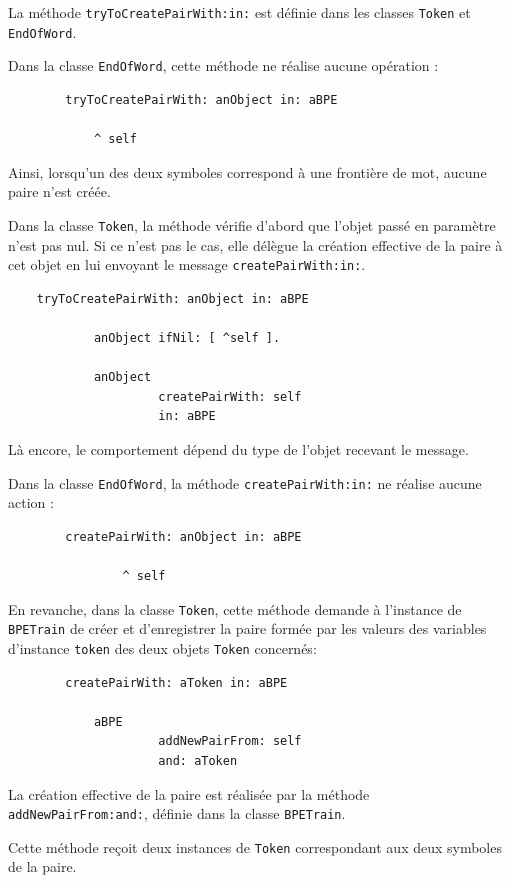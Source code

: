 \documentclass[12pt,a4paper]{report}
\begin{document}
	La méthode \texttt{tryToCreatePairWith:in:} est définie dans les classes \texttt{Token} et \texttt{EndOfWord}.
	
	Dans la classe \texttt{EndOfWord}, cette méthode ne réalise aucune opération :
	
	\begin{verbatim}
		tryToCreatePairWith: anObject in: aBPE
		
			^ self 
	\end{verbatim}
	
	Ainsi, lorsqu'un des deux symboles correspond à une frontière de mot, aucune paire n'est créée.
	
	Dans la classe \texttt{Token}, la méthode vérifie d'abord que l'objet passé en paramètre n'est pas nul. Si ce n'est pas le cas, elle délègue la création effective de la paire à cet objet en lui envoyant le message \texttt{createPairWith:in:}.
	
	\begin{verbatim}
	tryToCreatePairWith: anObject in: aBPE

			anObject ifNil: [ ^self ].
				
			anObject
					 createPairWith: self
					 in: aBPE 
	\end{verbatim}
	
	Là encore, le comportement dépend du type de l'objet recevant le message.
	
	Dans la classe \texttt{EndOfWord}, la méthode \texttt{createPairWith:in:} ne réalise aucune action :
	
	\begin{verbatim}
		createPairWith: anObject in: aBPE
			
				^ self 
	\end{verbatim}
	
	En revanche, dans la classe \texttt{Token}, cette méthode demande à l'instance de \texttt{BPETrain} de créer et d'enregistrer la paire formée par les valeurs des variables d'instance \texttt{token} des deux objets \texttt{Token} concernés:
	
	\begin{verbatim}
		createPairWith: aToken in: aBPE
		
			aBPE
					 addNewPairFrom: self
					 and: aToken
	\end{verbatim}
	
	La création effective de la paire est réalisée par la méthode \texttt{addNewPairFrom:and:}, définie dans la classe \texttt{BPETrain}.
	
	Cette méthode reçoit deux instances de \texttt{Token} correspondant aux deux symboles de la paire.
	
\end{document}
